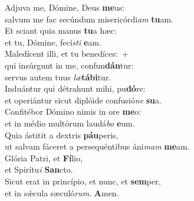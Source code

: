 \oddverse Adjuva me, Dómine, Deus \textbf{me}us:~\*\\
\oddverse salvum me fac secúndum misericórdi\textit{am} \textbf{tu}am.\\
\evenverse Et sciant quia manus \textbf{tu}a hæc:~\*\\
\evenverse et tu, Dómine, fecí\textit{sti} \textbf{e}am.\\
\oddverse Maledícent illi, et tu benedíces:~+\\
\oddverse  qui insúrgunt in me, confun\textbf{dán}tur:~\*\\
\oddverse servus autem tuus \textit{læ}\textbf{tá}\textbf{bi}tur.\\
\evenverse Induántur qui détrahunt mihi, pu\textbf{dó}re:~\*\\
\evenverse et operiántur sicut diplóide confusió\textit{ne} \textbf{su}a.\\
\oddverse Confitébor Dómino nimis in ore \textbf{me}o:~\*\\
\oddverse et in médio multórum laudá\textit{bo} \textbf{e}um.\\
\evenverse Quia ástitit a dextris \textbf{páu}peris,~\*\\
\evenverse ut salvam fáceret a persequéntibus áni\textit{mam} \textbf{me}am.\\
\oddverse Glória Patri, et \textbf{Fí}lio,~\*\\
\oddverse et Spirítu\textit{i} \textbf{San}cto.\\
\evenverse Sicut erat in princípio, et nunc, et \textbf{sem}per,~\*\\
\evenverse et in sǽcula sæculó\textit{rum}. \textbf{A}men.\\
